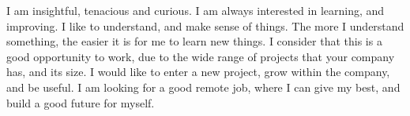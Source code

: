 \documentclass[11pt, a4paper]{awesome-cv}
\begin{document}
\begin{cvletter}

{I am insightful, tenacious and curious. I am always interested in learning, and improving. I like to understand, and make sense of things. The more I understand something, the easier it is for me to learn new things.}
{I consider that this is a good opportunity to work, due to the wide range of projects that your company has, and its size. I would like to enter a new project, grow within the company, and be useful.}
{I am looking for a good remote job, where I can give my best, and build a good future for myself.}
\end{cvletter}


\makeletterclosing
\end{document}
